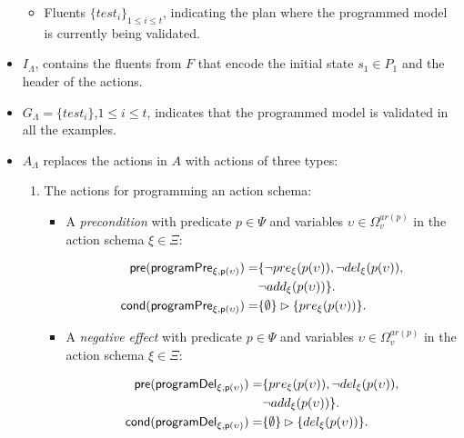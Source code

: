 \documentclass[letterpaper]{article} %
\newcommand{\pre}{\mathsf{pre}}     %
\newcommand{\cond}{\mathsf{cond}}   %
\begin{document}
\begin{itemize}
\begin{itemize}
\item Fluents $\{test_i\}_{1\leq i\leq t}$, indicating the plan where the programmed model is currently being validated.
\end{itemize}
\item $I_{\Lambda}$, contains the fluents from $F$ that encode the initial state $s_1\in P_1$ and the header of the actions.
\item $G_{\Lambda}=\{test_i\}$,{\small $1\leq i\leq t$}, indicates that the programmed model is validated in all the examples.
\item $A_{\Lambda}$ replaces the actions in $A$ with actions of three types:
\begin{enumerate}
\item The actions for programming an action schema:
\begin{itemize}
\item A {\em precondition} with predicate $p\in\Psi$ and variables $\upsilon\in\Omega_v^{ar(p)}$ in the action schema $\xi\in\Xi$:
\begin{small}
\begin{align*}
\hspace*{7pt}\pre(\mathsf{programPre_{\xi,p(\upsilon)}})=&\{\neg pre_{\xi}(p(\upsilon)),\neg del_{\xi}(p(\upsilon)),\\
                                                     &\neg add_{\xi}(p(\upsilon))\}.\\                     
\cond(\mathsf{programPre_{\xi,p(\upsilon)}})=&\{\emptyset\}\rhd\{pre_{\xi}(p(\upsilon))\}.
\end{align*}
\end{small}
\item A {\em negative effect} with predicate $p\in\Psi$ and variables $\upsilon\in\Omega_v^{ar(p)}$ in the action schema $\xi\in\Xi$:
\begin{small}
\begin{align*}
\hspace*{7pt}\pre(\mathsf{programDel_{\xi,p(\upsilon)}})=&\{pre_{\xi}(p(\upsilon)),\neg del_{\xi}(p(\upsilon)),\\
                                                     &\neg add_{\xi}(p(\upsilon))\}.\\                                                   
\cond(\mathsf{programDel_{\xi,p(\upsilon)}})=&\{\emptyset\}\rhd\{del_{\xi}(p(\upsilon))\}.
\end{align*}
\end{small}


\end{itemize}
\end{enumerate}
\end{itemize}
\end{document}
